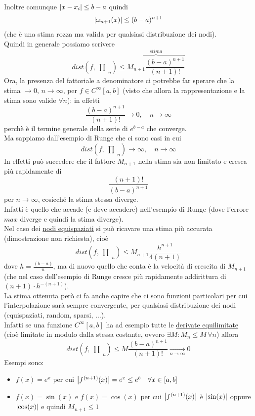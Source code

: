 \documentclass[12pt]{article}
\DeclarePairedDelimiter{\abs}{\lvert}{\rvert}
\newcommand{\inter}{\begin{matrix}\prod\end{matrix}}
\begin{document}
Inoltre comunque $\abs{x-x_i} \le b-a$ quindi
\[\abs*{\omega_{n+1}(x)} \le (b-a)^{n+1}\]
(che è una stima rozza ma valida per qualsiasi distribuzione dei nodi).\\
Quindi in generale possiamo scrivere
\[dist\left(f,\inter_n \right) \le \overbrace{M_{n+1} \frac{(b-a)^{n+1}}{(n+1)!}}^{stima}\]
Ora, la presenza del fattoriale a denominatore ci potrebbe far sperare che la stima $\to 0,\, n \to \infty$, per $f \in C^{\infty}[a,b]$ (visto che allora la rappresentazione e la stima sono valide $\forall n$): in effetti
\[\frac{(b-a)^{n+1}}{(n+1)!} \to 0, \quad n \to \infty\]
perchè è il termine generale della serie di $e^{b-a}$ che converge.\\
Ma sappiamo dall'esempio di Runge che ci sono casi in cui
\[dist\left(f,\inter_n \right) \to \infty, \quad n \to \infty\]
In effetti può succedere che il fattore $M_{n+1}$ nella stima sia non limitato e cresca più rapidamente di 
\[ \frac{(n+1)!}{(b-a)^{n+1}} \]
per $n \to \infty$, cosicché la stima stessa diverge.\\
Infatti è quello che accade (e deve accadere) nell'esempio di Runge (dove l'errore $max$ diverge e quindi la stima diverge).\\
Nel caso dei \underline{nodi equispaziati} si può ricavare una stima più accurata (dimostrazione non richiesta), cioè
\[dist\left(f,\inter_n \right) \le M_{n+1} \frac{h^{n+1}}{4(n+1)}\]
dove $h = \frac{(b-a)}{n}$, ma di nuovo quello che conta è la velocità di crescita di $M_{n+1}$ (che nel caso dell'esempio di Runge cresce più rapidamente addirittura di $(n+1) \cdot h^{-(n+1)}$).\\
La stima ottenuta però ci fa anche capire che ci sono funzioni particolari per cui l'interpolazione sarà sempre convergente, per qualsiasi distribuzione dei nodi (equispaziati, random, sparsi, $\dotso$).\\
Infatti se una funzione $C^{\infty}[a,b]$ ha ad esempio tutte le \underline{derivate equilimitate} (cioè limitate in modulo dalla stessa costante, ovvero $\exists M : M_n \le M \, \forall n$) allora
\[dist\left(f,\inter_n \right) \le M \frac{(b-a)^{n+1}}{(n+1)!} \underset{n \to \infty}{\longrightarrow} 0\]
Esempi sono:
\begin{itemize}
    \item $f(x)=e^x$ per cui $\abs*{f^{(n+1)}(x)} = e^x \le e^b \quad \forall x \in [a,b]$
    \item $f(x)=\sin (x)$ e $f(x)=\cos (x)$ per cui $\abs*{f^{(n+1)}(x)}$ è $\abs*{\sin(x)}$ oppure $\abs*{\cos(x)}$ e quindi $M_{n+1} \le 1$
\end{itemize}
\end{document}
